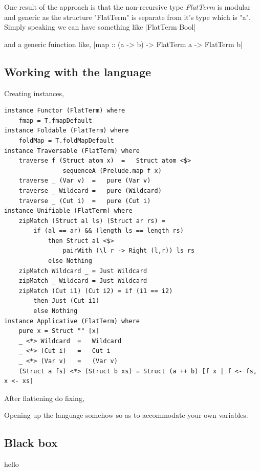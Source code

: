 \documentclass[proposal.tex]{subfiles}
\begin{document}
One result of the approach is that the non-recursive type \textit{FlatTerm} is modular and generic as the structure "FlatTerm" is separate 
from it's type which is "a". Simply speaking we can have something like 
|FlatTerm Bool|

and a generic fuinction like,
|map :: (a -> b) -> FlatTerm a -> FlatTerm b|


\subsection{Working with the language}
Creating instances,
\begin{verbatim}
instance Functor (FlatTerm) where
	fmap = T.fmapDefault
instance Foldable (FlatTerm) where
 	foldMap = T.foldMapDefault
instance Traversable (FlatTerm) where
  	traverse f (Struct atom x)	=	Struct atom <$> 
  				sequenceA (Prelude.map f x)
  	traverse _ (Var v)	=	pure (Var v)
  	traverse _ Wildcard	=	pure (Wildcard)
  	traverse _ (Cut i)	= 	pure (Cut i)
instance Unifiable (FlatTerm) where
	zipMatch (Struct al ls) (Struct ar rs) = 
		if (al == ar) && (length ls == length rs) 
			then Struct al <$> 
				pairWith (\l r -> Right (l,r)) ls rs  		
			else Nothing
	zipMatch Wildcard _ = Just Wildcard
	zipMatch _ Wildcard = Just Wildcard
	zipMatch (Cut i1) (Cut i2) = if (i1 == i2) 
		then Just (Cut i1) 
		else Nothing
instance Applicative (FlatTerm) where
	pure x = Struct "" [x] 
	_ <*> Wildcard	= 	Wildcard
	_ <*> (Cut i) 	= 	Cut i
	_ <*> (Var v)	=	(Var v)
	(Struct a fs) <*> (Struct b xs) = Struct (a ++ b) [f x | f <- fs, x <- xs] 
\end{verbatim}

After flattening do fixing,
 

Opening up the language somehow so as to accommodate your own variables.







\subsection{Black box}

hello
\end{document}
